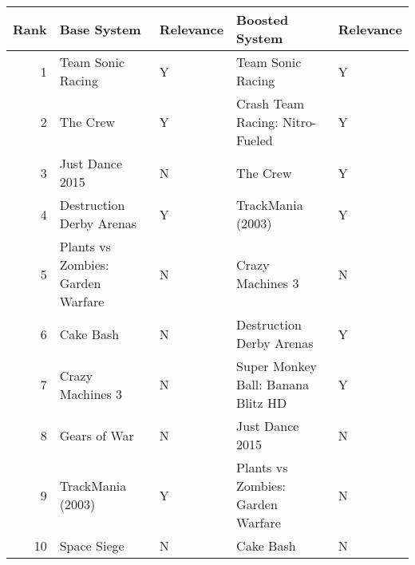 \begin{tabular}{rllll}
\toprule
 Rank &                       Base System & Relevance &                     Boosted System & Relevance \\
\midrule
    1 &                 Team Sonic Racing &         Y &                  Team Sonic Racing &         Y \\
    2 &                          The Crew &         Y &    Crash Team Racing: Nitro-Fueled &         Y \\
    3 &                   Just Dance 2015 &         N &                           The Crew &         Y \\
    4 &          Destruction Derby Arenas &         Y &                  TrackMania (2003) &         Y \\
    5 & Plants vs Zombies: Garden Warfare &         N &                   Crazy Machines 3 &         N \\
    6 &                         Cake Bash &         N &           Destruction Derby Arenas &         Y \\
    7 &                  Crazy Machines 3 &         N & Super Monkey Ball: Banana Blitz HD &         Y \\
    8 &                      Gears of War &         N &                    Just Dance 2015 &         N \\
    9 &                 TrackMania (2003) &         Y &  Plants vs Zombies: Garden Warfare &         N \\
   10 &                       Space Siege &         N &                          Cake Bash &         N \\
\bottomrule
\end{tabular}
